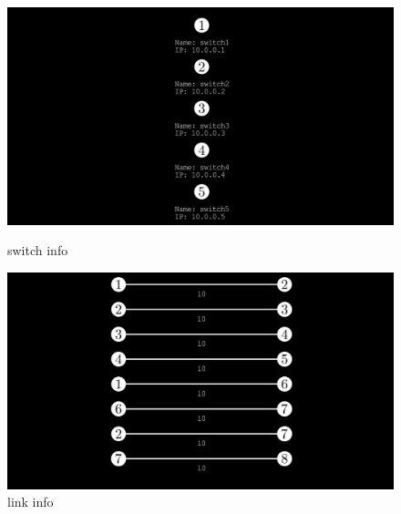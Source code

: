 \documentclass[binding=0.6cm]{sapthesis}
\begin{document}
\begin{figure}[ht]
    \centering
    \begin{minipage}{0.48\textwidth}
      \includegraphics[width=\linewidth]{immagini/switch_info.JPG}
      \caption{switch info}
      \label{fig:switch_info}
    \end{minipage}\hfill
    \begin{minipage}{0.48\textwidth}
      \includegraphics[width=\linewidth]{immagini/links_info.JPG}
      \caption{link info}
      \label{fig:links_info}
    \end{minipage}
\end{figure}
\end{document}
